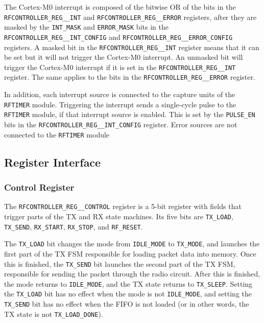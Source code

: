 The Cortex-M0 interrupt is composed of the bitwise OR of the bits in the \texttt{RFCONTROLLER\_REG\_\_INT} and \texttt{RFCONTROLLER\_REG\_\_ERROR} registers, after they are masked by the \texttt{INT\_MASK} and \texttt{ERROR\_MASK} bits in the \texttt{RFCONTROLLER\_REG\_\_INT\-\_CONFIG} and \texttt{RFCON\-T\-R\-O\-L\-L\-E\-R\-\_REG\_\_ERROR\_CONFIG} registers. A masked bit in the \texttt{RFCONTROLLER\-\_REG\_\_INT} register means that it can be set but it will not trigger the Cortex-M0 interrupt. An unmasked bit will trigger the Cortex-M0 interrupt if it is set in the \texttt{RFCONTROLLER\_REG\_\_INT} register. The same applies to the bits in the \texttt{RFCONTROLLER\_REG\_\_ERROR} register.

In addition, each interrupt source is connected to the capture units of the \texttt{RFTIMER} module. Triggering the interrupt sends a single-cycle pulse to the \texttt{RFTIMER} module, if that interrupt source is enabled. This is set by the \texttt{PULSE\_EN} bits in the \texttt{RFCONTROLLER\_REG\_\_INT\_CONFIG} register. Error sources are not connected to the \texttt{RFTIMER} module

\subsection{Register Interface} \label{rfcontroller-registers}

\subsubsection{Control Register}
The \texttt{RFCONTROLLER\_REG\_\_CONTROL} register is a 5-bit register with fields that trigger parts of the TX and RX state machines. Its five bits are \texttt{TX\_LOAD}, \texttt{TX\_SEND}, \texttt{RX\_START}, \texttt{RX\_STOP}, and \texttt{RF\_RESET}.

The \texttt{TX\_LOAD} bit changes the mode from \texttt{IDLE\_MODE} to \texttt{TX\_MODE}, and launches the first part of the TX FSM responsible for loading packet data into memory. Once this is finished, the \texttt{TX\_SEND} bit launches the second part of the TX FSM, responsible for sending the packet through the radio circuit. After this is finished, the mode returns to \texttt{IDLE\_MODE}, and the TX state returns to \texttt{TX\_SLEEP}. Setting the \texttt{TX\_LOAD} bit has no effect when the mode is not \texttt{IDLE\_MODE}, and setting the \texttt{TX\_SEND} bit has no effect when the FIFO is not loaded (or in other words, the TX state is not \texttt{TX\_LOAD\_DONE}).

